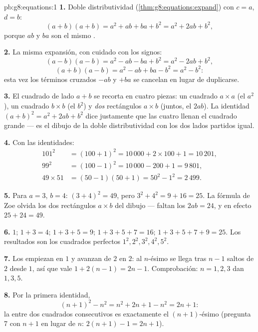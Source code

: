 \begin{solution}{pb:g8:equations:1}
\textbf{1.} Doble distributividad
(\cref{thm:g8:equations:expand}) con $c = a$, $d = b$:
\[
(a + b)(a + b) = a^2 + ab + ba + b^2 = a^2 + 2ab + b^2 ,
\]
porque $ab$ y $ba$ son el mismo .

\textbf{2.} La misma expansión, con cuidado con los signos:
\[
(a - b)(a - b) = a^2 - ab - ba + b^2 = a^2 - 2ab + b^2 ,
\]
\[
(a + b)(a - b) = a^2 - ab + ba - b^2 = a^2 - b^2 :
\]
esta vez los términos cruzados $-ab$ y $+ba$ se cancelan en lugar de
duplicarse.

\textbf{3.} El cuadrado de lado $a + b$ se recorta en cuatro piezas: un
cuadrado $a \times a$ (el $a^2$), un cuadrado $b \times b$ (el
$b^2$) y \emph{dos} rectángulos $a \times b$ (juntos, el
$2ab$). La identidad $(a+b)^2 = a^2 + 2ab + b^2$ dice justamente
que las cuatro  llenan el cuadrado grande --- es el dibujo de
la doble distributividad con los dos lados partidos igual.

\textbf{4.} Con las identidades:
\begin{align*}
101^2 &= (100 + 1)^2 = 10\,000 + 2 \times 100 + 1 = 10\,201, \\
99^2 &= (100 - 1)^2 = 10\,000 - 200 + 1 = 9\,801, \\
49 \times 51 &= (50 - 1)(50 + 1) = 50^2 - 1^2 = 2\,499 .
\end{align*}

\textbf{5.} Para $a = 3$, $b = 4$: $(3 + 4)^2 = 49$, pero
$3^2 + 4^2 = 9 + 16 = 25$. La fórmula de Zoe olvida los dos
rectángulos $a \times b$ del dibujo --- faltan los
$2ab = 24$, y en efecto $25 + 24 = 49$.

\textbf{6.} $1$; $1 + 3 = 4$; $1 + 3 + 5 = 9$;
$1 + 3 + 5 + 7 = 16$; $1 + 3 + 5 + 7 + 9 = 25$. Los resultados son
los cuadrados perfectos $1^2, 2^2, 3^2, 4^2, 5^2$.

\textbf{7.} Los  empiezan en $1$ y avanzan de $2$ en
$2$: al $n$-ésimo se llega tras $n - 1$ saltos de $2$ desde
$1$, así que vale $1 + 2(n - 1) = 2n - 1$. Comprobación: $n = 1, 2, 3$
dan $1, 3, 5$.

\textbf{8.} Por la primera identidad,
\[
(n + 1)^2 - n^2 = n^2 + 2n + 1 - n^2 = 2n + 1 :
\]
la  entre dos cuadrados consecutivos es exactamente el
 $(n+1)$-ésimo (pregunta 7 con $n + 1$ en lugar de $n$:
$2(n+1) - 1 = 2n + 1$).


\end{solution}
